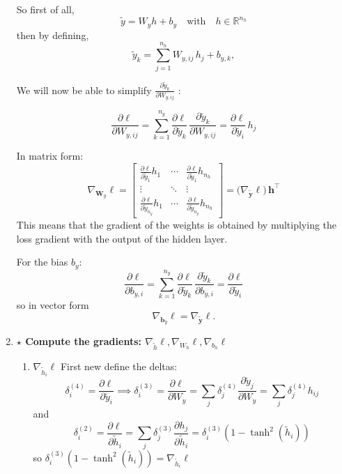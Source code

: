 \documentclass[12pt,a4paper]{article}
\begin{document}
\begin{enumerate}[resume]
    So first of all,
    \[
    \tilde{y} = W_y h + b_y \quad \text{with} \quad h \in \mathbb{R}^{n_h}
    \]
    then by defining,
    \[
    \tilde{y}_k = \sum_{j=1}^{n_h} W_{y,ij}\,h_j + b_{y,k} ,
    \]

    We will now be able to simplify $ \frac{\partial \tilde{y}_k}{\partial W_{y,ij}} $ :
    
    \[
    \frac{\partial \ell}{\partial W_{y,ij}}
    = \sum_{k=1}^{n_y} \frac{\partial \ell}{\partial \tilde{y}_k}\,\frac{\partial \tilde{y}_k}{\partial W_{y,ij}}
    = \frac{\partial \ell}{\partial \tilde{y}_i}\,h_j 
    \]

    In matrix form:
    \[
    \nabla_{\mathbf{W}_y}\ell =
    \begin{bmatrix}
    \frac{\partial \ell}{\partial \tilde{y}_1} h_1 & \cdots & \frac{\partial \ell}{\partial \tilde{y}_1} h_{n_h}\\
    \vdots & \ddots & \vdots\\
    \frac{\partial \ell}{\partial \tilde{y}_{n_y}} h_1 & \cdots & \frac{\partial \ell}{\partial \tilde{y}_{n_y}} h_{n_h}
    \end{bmatrix}
    = \big(\nabla_{\tilde{\mathbf{y}}}\ell\big)\,\mathbf{h}^{\!\top}
    \]
    This means that the gradient of the weights is obtained by multiplying the loss gradient with the output of the hidden layer.

    For the bias $b_y$:
    \[
    \frac{\partial \ell}{\partial b_{y,i}}
    = \sum_{k=1}^{n_y} \frac{\partial \ell}{\partial \tilde{y}_k}\,\frac{\partial \tilde{y}_k}{\partial b_{y,i}}
    = \frac{\partial \ell}{\partial \tilde{y}_i}
    \]
    so in vector form
    \[
    \nabla_{\mathbf{b}_y}\ell = \nabla_{\tilde{\mathbf{y}}}\ell .
    \]

    \item \textbf{$\star$ Compute the gradients: $\nabla_{\tilde{h}}\ell, \nabla_{W_h}\ell, \nabla_{b_h}\ell$}

    \begin{enumerate}
        \item $ \nabla_{\tilde{h}_i}\ell $ \newline
        First new define the deltas: 
        \[
        \delta_i^{(4)} = \frac{\partial \ell}{\partial \tilde{y}_i} \implies \delta_i^{(3)} = 
        \frac{\partial \ell}{\partial W_y} = \sum_j \delta_j^{(4)} \frac{\partial \tilde{y}_j}{\partial W_y} =
        \sum_j \delta_j^{(4)} h_{ij} 
        \]
        and
        \[
        \delta_i^{(2)} = \frac{\partial \ell}{\partial \tilde{h}_i} = \sum_j \delta_j^{(3)} \frac{\partial h_j}{\partial \tilde{h}_i} =
        \delta_i^{(3)} (1 - \tanh^2(\tilde{h}_i))
        \]
        so $\delta_i^{(3)} (1 - \tanh^2(\tilde{h}_i)) = \nabla_{\tilde{h}_i}\ell $
        

\end{enumerate}
\end{enumerate}
\end{document}
